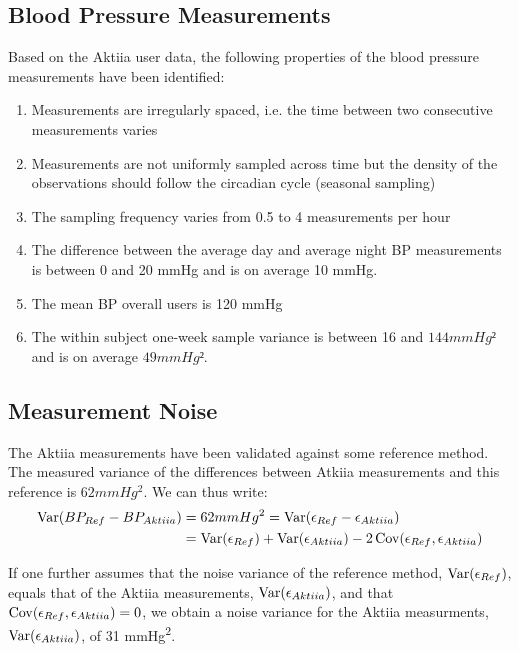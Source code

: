 \subsection{Blood Pressure Measurements}\label{subsec:blood-pressure-measurements}
Based on the Aktiia user data, the following properties of
the blood pressure measurements have been identified:
\begin{enumerate}
    \item Measurements are irregularly spaced, i.e. the time between two consecutive measurements varies
    \item Measurements are not uniformly sampled across time but the density of the observations should
    follow the circadian cycle (seasonal sampling)
    \item The sampling frequency varies from 0.5 to 4 measurements per hour
    \item The difference between the average day and average night BP measurements is between
    0 and 20 mmHg and is on average 10 mmHg.
    \item The mean BP overall users is 120 mmHg
    \item The within subject one-week sample variance is between 16 and $144 mmHg²$ and is on average $49 mmHg²$.
\end{enumerate}


\subsection{Measurement Noise}

The Aktiia measurements have been validated against some
reference method.
The measured variance of the differences between Atkiia measurements
and this reference is $62 mmHg^2$.
We can thus write:
\begin{align*}
    \operatorname{Var}(BP_{Ref} - BP_{Aktiia})
    & = 62 mmHg^2 = \operatorname{Var}(\epsilon_{Ref} - \epsilon_{Aktiia}) \\
    & = \operatorname{Var}(\epsilon_{Ref}) + \operatorname{Var}(\epsilon_{Aktiia}) - 2\operatorname{Cov}(\epsilon_{Ref},
    \epsilon_{Aktiia})
\end{align*}

If one further assumes that the noise variance of the reference method,
$\operatorname{Var}(\epsilon_{Ref})$, equals that of the Aktiia measurements, $\operatorname{Var}(\epsilon_{Aktiia})$,
and that $\operatorname{Cov}(\epsilon_{Ref}, \epsilon_{Aktiia})=0$, we obtain a noise variance
for the Aktiia measurments,
$\operatorname{Var}(\epsilon_{Aktiia})$, of 31 mmHg\textsuperscript{2}.




